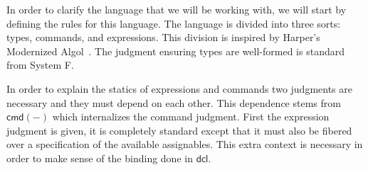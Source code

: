 \documentclass[a0,landscape]{a0poster}
\newcommand{\declareJudgement}[1]{\framebox{$\displaystyle{}{#1}$}}
\newcommand{\hasE}[2]{\ensuremath{#1 \mathrel{:} #2}}
\newcommand{\hasTJ}[4]{\ifthenelse{\isempty{#1}}%
  {\ensuremath{#2 \vdash \hasE{#3}{#4}}}%
  {\ensuremath{#1;#2 \vdash \hasE{#3}{#4}}}}
\newcommand{\hasESigJ}[5]{\ensuremath{#1; #2 \vdash_{#3} \hasE{#4}{#5}}}
\newcommand{\fn}[2]{\ensuremath{#1 \to #2}}
\newcommand{\tp}{\ensuremath{\mathsf{T}}}
\newcommand{\cmd}[1]{\ensuremath{\mathsf{cmd}(#1)}}
\newcommand{\ap}[2]{\ensuremath{#1\ #2}}
\newcommand{\lam}[3]{\ensuremath{\lambda #1 {:} #2.\, #3}}
\newcommand{\allNoKind}[2]{\ensuremath{\forall #1.\, #2}}
\newcommand{\Ap}[2]{\ensuremath{#1[#2]}}
\newcommand{\LamNoKind}[2]{\ensuremath{\Lambda #1.\, #2}}
\begin{document}
\begin{multicols}{4}
  In order to clarify the language that we will be working with, we will
  start by defining the rules for this language. The language is
  divided into three sorts: types, commands, and expressions. This
  division is inspired by Harper's Modernized
  Algol~\citep{Harper:16}. The judgment ensuring types are well-formed
  is standard from System F.
  In order to explain the statics of expressions and commands two
  judgments are necessary and they must depend on each other. This
  dependence stems from $\cmd{-}$ which internalizes the command
  judgment. First the expression judgment is given, it is completely
  standard except that it must also be fibered over a specification of
  the available assignables. This extra context is necessary in order to
  make sense of the binding done in $\mathsf{dcl}$.
\end{multicols}
\end{document}
